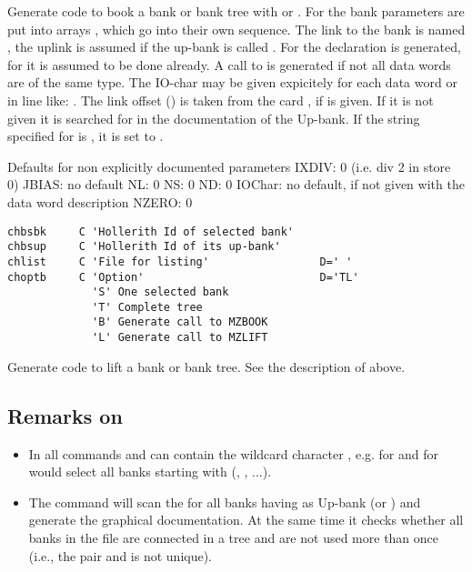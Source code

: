 Generate code to book a bank or bank tree with 
or .
For  the bank parameters are put into arrays
, which go into their own  sequence.
The link to the bank  is named , 
the uplink is assumed  if the up-bank is called .
For  the declaration  is generated, 
for  it is assumed to be done already. 
A call to  is generated if not all data
words are of the same type. The IO-char may be given expicitely for
each data word or in line like: .
The link offset () is taken from the card , 
if  is given. 
If it is not given it is searched for in the documentation of the Up-bank. 
If the string specified for  is ,
it is set to .
 
\begin{XMPt}{Defaults for non explicitly documented parameters}
  IXDIV:  0 (i.e. div 2 in store 0)
  JBIAS:  no default
  NL:     0
  NS:     0
  ND:     0
  IOChar: no default, if not given with the data word description
  NZERO:  0
\end{XMPt}
 
 
\begin{verbatim}
chbsbk     C 'Hollerith Id of selected bank'
chbsup     C 'Hollerith Id of its up-bank'
chlist     C 'File for listing'                 D=' '
choptb     C 'Option'                           D='TL'
             'S' One selected bank
             'T' Complete tree
             'B' Generate call to MZBOOK
             'L' Generate call to MZLIFT
\end{verbatim}
 
Generate code to lift a bank or bank tree.
See the description of  above.
 
\subsection*{Remarks on }
 
\begin{itemize}
\item In all  commands  and  can contain 
      the wildcard character \Lit{*}, e.g.  for  
      and  for  would select all banks starting
      with  (, , ...). 
\item The command  will scan the \RZfile{}
      for all banks having as Up-bank  (or ) 
      and generate the graphical documentation. 
      At the same time it checks whether all banks in the file are connected 
      in a tree and are not used more than once
      (i.e., the pair   and  is not unique).
\end{itemize}
 
